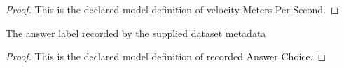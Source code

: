 \begin{proof}
  This is the declared model definition of velocity Meters Per Second.
\end{proof}
\begin{definition}
  \label{def:physics:phyx-mini-0718:phyxminiproblems-problemphyxmini0718-recordedanswerchoice}
  The answer label recorded by the supplied dataset metadata
\end{definition}
\begin{proof}
  This is the declared model definition of recorded Answer Choice.
\end{proof}
